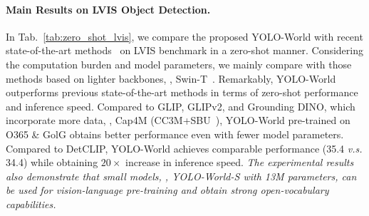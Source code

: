 \documentclass[10pt,twocolumn,letterpaper]{article}
\newcommand{\name}{YOLO-World}
\begin{document}
\paragraph{Main Results on LVIS Object Detection.}
In Tab.~\ref{tab:zero_shot_lvis}, we compare the proposed \name{} with recent state-of-the-art methods~\cite{mdetr,GLIPv2,DetCLIP,DetCLIPv2,GroundingDINO} on LVIS benchmark in a zero-shot manner.
Considering the computation burden and model parameters, we mainly compare with those methods based on lighter backbones, \eg, Swin-T~\cite{SwinTransformer}.
Remarkably, \name{} outperforms previous state-of-the-art methods in terms of zero-shot performance and inference speed.
Compared to GLIP, GLIPv2, and Grounding DINO, which incorporate more data, \eg, Cap4M (CC3M+SBU~\cite{SBU}), \name{} pre-trained on O365 \& GolG obtains better performance even with fewer model parameters.
Compared to DetCLIP, \name{} achieves comparable performance (35.4 \textit{v.s.} 34.4) while obtaining $20\times$ increase in inference speed.
\textit{The experimental results also demonstrate that small models, \eg, \name{}-S with 13M parameters, can be used for vision-language pre-training and obtain strong open-vocabulary capabilities.}
\end{document}
